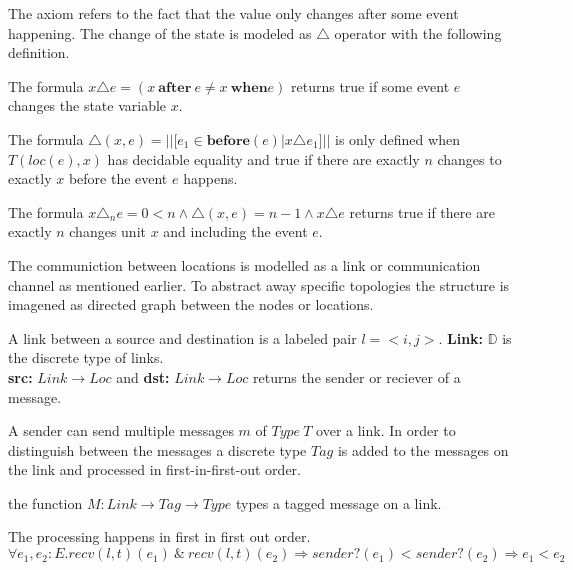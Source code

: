 The axiom refers to the fact that the value only changes after some event
happening. The change of the state is modeled as $\triangle$ operator with the
following definition.~\cite{bickford2005causal}

\begin{defi}
  The formula $x\triangle e = (x\ \textbf{after}\ e\ne x\ \textbf{when} e)$ returns true
  if some event $e$ changes the state variable $x$.
\end{defi}

\begin{defi}
  The formula $\triangle (x,e) = ||[e_1\in \textbf{before}(e)|x\triangle e_1]||$ is only defined when
  $T(loc(e),x)$ has decidable equality and true if there are exactly $n$ changes to
  exactly $x$ before the event $e$ happens.  
\end{defi}

\begin{defi}
  The formula $x\triangle_n e = 0<n\wedge \triangle (x,e)=n-1\wedge x\triangle e$ returns true if there are
  exactly $n$ changes unit $x$ and including the event $e$.
\end{defi}

The communiction between locations is modelled as a link or communication
channel as mentioned earlier. To abstract away specific topologies the structure
is imagened as directed graph between the nodes or locations.~\cite{bickford2005causal}

\begin{defi}
  A link between a source and destination is a labeled pair $l=<i,j>$.
  \textbf{Link:} $\mathbb{D}$ is the discrete type of links.\\
  \textbf{src:} $Link\rightarrow Loc$ and \textbf{dst:} $Link\rightarrow Loc$ returns the sender
  or reciever of a message.
\end{defi}

A sender can send multiple messages $m$ of $Type\ T$ over a link.
In order to distinguish between the messages a discrete type $Tag$
is added to the messages on the link and processed in first-in-first-out order.~\cite{bickford2005causal}

\begin{defi}
  the function $M:Link\rightarrow Tag\rightarrow Type$ types a tagged message on a link.
\end{defi}

\begin{axiom}
  The processing happens in first in first out order.\\
  $\forall e_1,e_2:E.recv(l,t)(e_1)\ \&\ recv(l,t)(e_2) \Rightarrow sender?(e_1)<sender?(e_2)\Rightarrow e_1<e_2$
\end{axiom}

